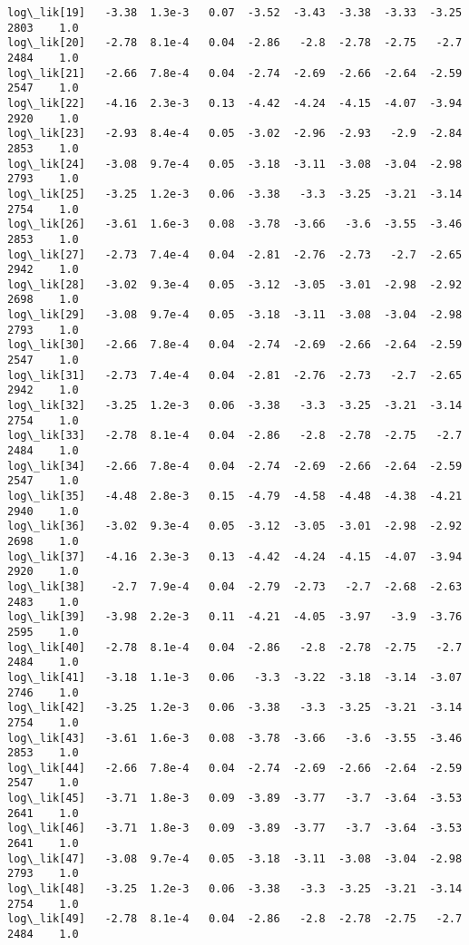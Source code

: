 \documentclass[11pt]{article}
\begin{document}
\begin{Verbatim}[commandchars=\\\{\}]
log\_lik[19]   -3.38  1.3e-3   0.07  -3.52  -3.43  -3.38  -3.33  -3.25   2803    1.0
log\_lik[20]   -2.78  8.1e-4   0.04  -2.86   -2.8  -2.78  -2.75   -2.7   2484    1.0
log\_lik[21]   -2.66  7.8e-4   0.04  -2.74  -2.69  -2.66  -2.64  -2.59   2547    1.0
log\_lik[22]   -4.16  2.3e-3   0.13  -4.42  -4.24  -4.15  -4.07  -3.94   2920    1.0
log\_lik[23]   -2.93  8.4e-4   0.05  -3.02  -2.96  -2.93   -2.9  -2.84   2853    1.0
log\_lik[24]   -3.08  9.7e-4   0.05  -3.18  -3.11  -3.08  -3.04  -2.98   2793    1.0
log\_lik[25]   -3.25  1.2e-3   0.06  -3.38   -3.3  -3.25  -3.21  -3.14   2754    1.0
log\_lik[26]   -3.61  1.6e-3   0.08  -3.78  -3.66   -3.6  -3.55  -3.46   2853    1.0
log\_lik[27]   -2.73  7.4e-4   0.04  -2.81  -2.76  -2.73   -2.7  -2.65   2942    1.0
log\_lik[28]   -3.02  9.3e-4   0.05  -3.12  -3.05  -3.01  -2.98  -2.92   2698    1.0
log\_lik[29]   -3.08  9.7e-4   0.05  -3.18  -3.11  -3.08  -3.04  -2.98   2793    1.0
log\_lik[30]   -2.66  7.8e-4   0.04  -2.74  -2.69  -2.66  -2.64  -2.59   2547    1.0
log\_lik[31]   -2.73  7.4e-4   0.04  -2.81  -2.76  -2.73   -2.7  -2.65   2942    1.0
log\_lik[32]   -3.25  1.2e-3   0.06  -3.38   -3.3  -3.25  -3.21  -3.14   2754    1.0
log\_lik[33]   -2.78  8.1e-4   0.04  -2.86   -2.8  -2.78  -2.75   -2.7   2484    1.0
log\_lik[34]   -2.66  7.8e-4   0.04  -2.74  -2.69  -2.66  -2.64  -2.59   2547    1.0
log\_lik[35]   -4.48  2.8e-3   0.15  -4.79  -4.58  -4.48  -4.38  -4.21   2940    1.0
log\_lik[36]   -3.02  9.3e-4   0.05  -3.12  -3.05  -3.01  -2.98  -2.92   2698    1.0
log\_lik[37]   -4.16  2.3e-3   0.13  -4.42  -4.24  -4.15  -4.07  -3.94   2920    1.0
log\_lik[38]    -2.7  7.9e-4   0.04  -2.79  -2.73   -2.7  -2.68  -2.63   2483    1.0
log\_lik[39]   -3.98  2.2e-3   0.11  -4.21  -4.05  -3.97   -3.9  -3.76   2595    1.0
log\_lik[40]   -2.78  8.1e-4   0.04  -2.86   -2.8  -2.78  -2.75   -2.7   2484    1.0
log\_lik[41]   -3.18  1.1e-3   0.06   -3.3  -3.22  -3.18  -3.14  -3.07   2746    1.0
log\_lik[42]   -3.25  1.2e-3   0.06  -3.38   -3.3  -3.25  -3.21  -3.14   2754    1.0
log\_lik[43]   -3.61  1.6e-3   0.08  -3.78  -3.66   -3.6  -3.55  -3.46   2853    1.0
log\_lik[44]   -2.66  7.8e-4   0.04  -2.74  -2.69  -2.66  -2.64  -2.59   2547    1.0
log\_lik[45]   -3.71  1.8e-3   0.09  -3.89  -3.77   -3.7  -3.64  -3.53   2641    1.0
log\_lik[46]   -3.71  1.8e-3   0.09  -3.89  -3.77   -3.7  -3.64  -3.53   2641    1.0
log\_lik[47]   -3.08  9.7e-4   0.05  -3.18  -3.11  -3.08  -3.04  -2.98   2793    1.0
log\_lik[48]   -3.25  1.2e-3   0.06  -3.38   -3.3  -3.25  -3.21  -3.14   2754    1.0
log\_lik[49]   -2.78  8.1e-4   0.04  -2.86   -2.8  -2.78  -2.75   -2.7   2484    1.0

\end{Verbatim}
\end{document}

